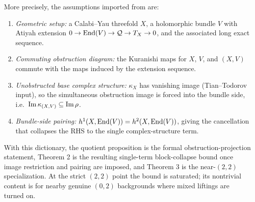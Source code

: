 \documentclass[12pt]{article}
\begin{document}
		More precisely, the assumptions imported from \cite{Anderson:2011ty} are:
		\begin{enumerate}
		\item {\it Geometric setup:} a Calabi--Yau threefold $X$, a holomorphic bundle $V$ with Atiyah extension $0\to \textnormal{End}(V)\to \mathcal Q\to T_X\to 0$, and the associated long exact sequence.
		\item {\it Commuting obstruction diagram:} the Kuranishi maps for $X$, $V$, and $(X,V)$ commute with the maps induced by the extension sequence.
		\item {\it Unobstructed base complex structure:} $\kappa_X$ has vanishing image (Tian--Todorov input), so the simultaneous obstruction image is forced into the bundle side, i.e.\ $\textnormal{Im}\,\kappa_{(X,V)}\subseteq \textnormal{Im}\,\rho$.
		\item {\it Bundle-side pairing:} $h^1(X,\textnormal{End}(V))=h^2(X,\textnormal{End}(V))$, giving the cancellation that collapses the RHS to the single complex-structure term.
		\end{enumerate}
		With this dictionary, the quotient proposition is the formal obstruction-projection statement, Theorem 2 is the resulting single-term block-collapse bound once image restriction and pairing are imposed, and Theorem 3 is the near-$(2,2)$ specialization. At the strict $(2,2)$ point the bound is saturated; its nontrivial content is for nearby genuine $(0,2)$ backgrounds where mixed liftings are turned on.
		
		
		
		
\end{document}
